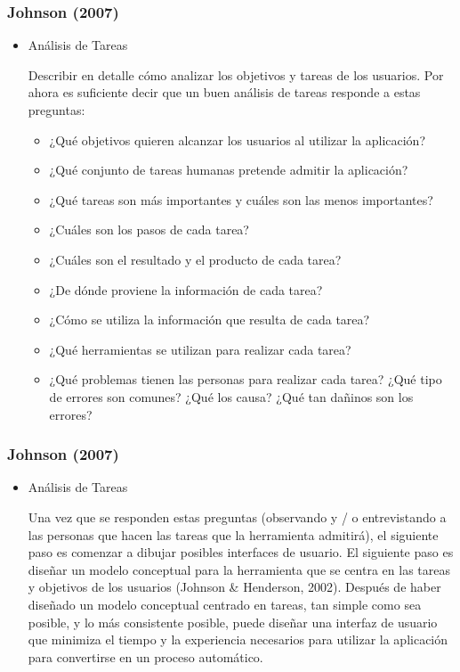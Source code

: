 \documentclass[11pt]{beamer}
\begin{document}
\begin{frame}
\frametitle{Johnson (2007)}
\begin{itemize}
\color{red}
\item Análisis de Tareas
    \par
    \justify
    \color{black}
    Describir en detalle cómo analizar los objetivos y tareas de los usuarios. Por ahora es suficiente decir que un buen análisis de tareas responde a estas preguntas:
    \begin{itemize}
    \item ¿Qué objetivos quieren alcanzar los usuarios al utilizar la aplicación?
    \item ¿Qué conjunto de tareas humanas pretende admitir la aplicación?
    \item ¿Qué tareas son más importantes y cuáles son las menos importantes?
    \item ¿Cuáles son los pasos de cada tarea?
    \item ¿Cuáles son el resultado y el producto de cada tarea?
    \item ¿De dónde proviene la información de cada tarea?
    \item ¿Cómo se utiliza la información que resulta de cada tarea?
    \item ¿Qué herramientas se utilizan para realizar cada tarea?
    \item ¿Qué problemas tienen las personas para realizar cada tarea? ¿Qué tipo de errores son comunes? ¿Qué los causa? ¿Qué tan dañinos son los errores?
    \end{itemize}
\end{itemize}
\end{frame}

\begin{frame}
\frametitle{Johnson (2007)}
\begin{itemize}
\color{red}
\item Análisis de Tareas
    \par
    \justify
    \color{black}
    Una vez que se responden estas preguntas (observando y / o entrevistando a las personas que hacen las tareas que la herramienta admitirá), el siguiente paso es comenzar a dibujar posibles interfaces de usuario. El siguiente paso es diseñar un modelo conceptual para la herramienta que se centra en las tareas y objetivos de los usuarios (Johnson & Henderson, 2002). Después de haber diseñado un modelo conceptual centrado en tareas, tan simple como sea posible, y lo más consistente posible, puede diseñar una interfaz de usuario que minimiza el tiempo y la experiencia necesarios para utilizar la aplicación para convertirse en un proceso automático.
    \end{itemize}
    
\end{frame}
\end{document}
